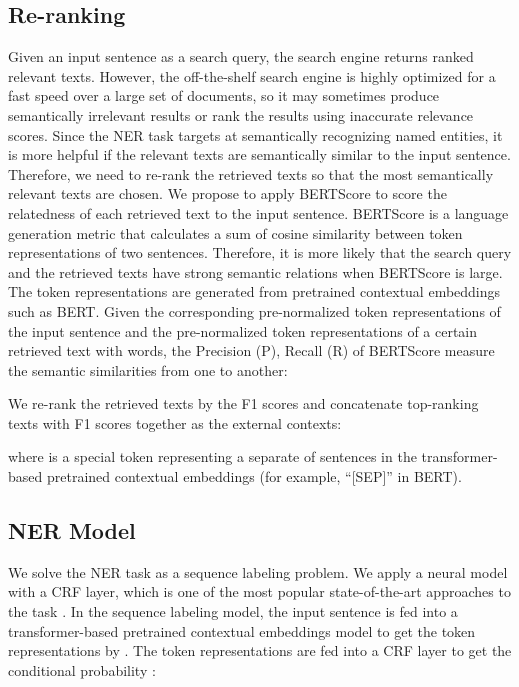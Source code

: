 \documentclass[11pt,a4paper]{article}
\begin{document}
\subsection{Re-ranking}
Given an input sentence as a search query, the search engine returns ranked relevant texts. However, the off-the-shelf search engine is highly optimized for a fast speed over a large set of documents, so it may sometimes produce semantically irrelevant results or rank the results using inaccurate relevance scores.
Since the NER task targets at semantically recognizing named entities, it is more helpful if the relevant texts are semantically similar to the input sentence. Therefore, we need to re-rank the retrieved texts so that the most semantically relevant texts are chosen. We propose to apply BERTScore \citep{Zhang*2020BERTScore:} to score the relatedness of each retrieved text to the input sentence. BERTScore is a language generation metric that calculates a sum of cosine similarity between token representations of two sentences. Therefore, it is more likely that the search query and the retrieved texts have strong semantic relations when BERTScore is large. The token representations are generated from pretrained contextual embeddings such as BERT. Given the corresponding pre-normalized token representations  of the input sentence  and the pre-normalized token representations  of a certain retrieved text  with  words, the Precision (P), Recall (R) of BERTScore measure the semantic similarities from one to another:

 We re-rank the retrieved texts by the F1 scores  and concatenate  top-ranking texts  with F1 scores together as the external contexts:
 
where  is a special token representing a separate of sentences in the transformer-based pretrained contextual embeddings (for example, ``[SEP]'' in BERT).


\subsection{NER Model}
We solve the NER task as a sequence labeling problem. We apply a neural model with a CRF layer, which is one of the most popular state-of-the-art approaches to the task \citep{lample-etal-2016-neural,ma-hovy-2016-end,akbik-etal-2019-pooled}. In the sequence labeling model, the input sentence  is fed into a transformer-based pretrained contextual embeddings model to get the token representations  by .
The token representations are fed into a CRF layer to get the conditional probability :
\end{document}

